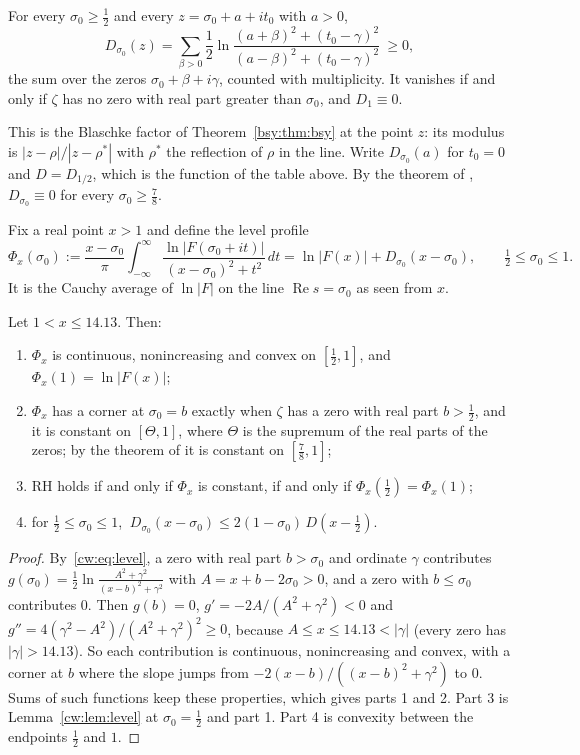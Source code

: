 \begin{lemma}[proved]\label{cw:lem:level}
For every $\sigma_0\ge\frac12$ and every $z=\sigma_0+a+it_0$ with $a>0$,
\begin{equation}\label{cw:eq:level}
D_{\sigma_0}(z)=\sum_{\beta>0}\frac12\ln\frac{(a+\beta)^2+(t_0-\gamma)^2}{(a-\beta)^2+(t_0-\gamma)^2}\ \ge0,
\end{equation}
the sum over the zeros $\sigma_0+\beta+i\gamma$, counted with multiplicity. It vanishes if and only if $\zeta$ has no zero with real part greater than $\sigma_0$, and $D_1\equiv0$.
\end{lemma}

This is the Blaschke factor of Theorem~\ref{bsy:thm:bsy} at the point $z$: its modulus is $|z-\rho|/|z-\rho^*|$ with $\rho^*$ the reflection of $\rho$ in the line. Write $D_{\sigma_0}(a)$ for $t_0=0$ and $D=D_{1/2}$, which is the function of the table above. By the theorem of \cite{OAI26a}, $D_{\sigma_0}\equiv0$ for every $\sigma_0\ge\frac78$.

Fix a real point $x>1$ and define the level profile
\[
\Phi_x(\sigma_0):=\frac{x-\sigma_0}\pi\int_{-\infty}^\infty\frac{\ln|F(\sigma_0+it)|}{(x-\sigma_0)^2+t^2}\,dt=\ln|F(x)|+D_{\sigma_0}(x-\sigma_0),\qquad\tfrac12\le\sigma_0\le1 .
\]
It is the Cauchy average of $\ln|F|$ on the line $\operatorname{Re}s=\sigma_0$ as seen from $x$.

\begin{theorem}[proved]\label{cw:thm:profile}
Let $1<x\le14.13$. Then:
\begin{enumerate}
\item $\Phi_x$ is continuous, nonincreasing and convex on $[\frac12,1]$, and $\Phi_x(1)=\ln|F(x)|$;
\item $\Phi_x$ has a corner at $\sigma_0=b$ exactly when $\zeta$ has a zero with real part $b>\frac12$, and it is constant on $[\Theta,1]$, where $\Theta$ is the supremum of the real parts of the zeros; by the theorem of \cite{OAI26a} it is constant on $[\frac78,1]$;
\item RH holds if and only if $\Phi_x$ is constant, if and only if $\Phi_x(\frac12)=\Phi_x(1)$;
\item for $\frac12\le\sigma_0\le1$, $\ D_{\sigma_0}(x-\sigma_0)\le2(1-\sigma_0)\,D(x-\tfrac12)$.
\end{enumerate}
\end{theorem}

\begin{proof}
By~\eqref{cw:eq:level}, a zero with real part $b>\sigma_0$ and ordinate $\gamma$ contributes $g(\sigma_0)=\frac12\ln\frac{A^2+\gamma^2}{(x-b)^2+\gamma^2}$ with $A=x+b-2\sigma_0>0$, and a zero with $b\le\sigma_0$ contributes 0. Then $g(b)=0$, $g'=-2A/(A^2+\gamma^2)<0$ and $g''=4(\gamma^2-A^2)/(A^2+\gamma^2)^2\ge0$, because $A\le x\le14.13<|\gamma|$ (every zero has $|\gamma|>14.13$). So each contribution is continuous, nonincreasing and convex, with a corner at $b$ where the slope jumps from $-2(x-b)/((x-b)^2+\gamma^2)$ to 0. Sums of such functions keep these properties, which gives parts 1 and 2. Part 3 is Lemma~\ref{cw:lem:level} at $\sigma_0=\frac12$ and part 1. Part 4 is convexity between the endpoints $\frac12$ and $1$.
\end{proof}

